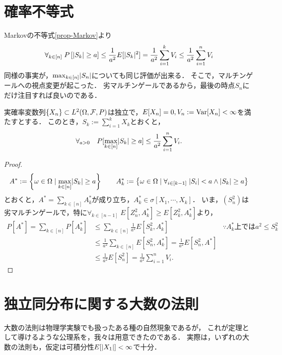 \documentclass[uplatex,dvipdfmx]{jsreport}
\begin{document}
\section{確率不等式}

\begin{tcolorbox}[colframe=ForestGreen, colback=ForestGreen!10!white,breakable,colbacktitle=ForestGreen!40!white,coltitle=black,fonttitle=\bfseries\sffamily,
title=]
    Markovの不等式\ref{prop-Markov}より
    \[\forall_{k\in[n]}\;P\left[\lvert S_k\rvert\ge a\right]\le\frac{1}{a^2}E[\lvert S_k\rvert^2]=\frac{1}{a^2}\sum_{i=1}^kV_i\le\frac{1}{a^2}\sum^n_{i=1}V_i\]
    同様の事実が，$\max_{k\in[n]}\lvert S_n\rvert$についても同じ評価が出来る．
    そこで，マルチンゲールへの視点変更が起こった．
    劣マルチンゲールであるから，最後の時点$S_n$にだけ注目すれば良いのである．
\end{tcolorbox}

\begin{theorem}[Kolmogorov]\label{thm-Kolmogorov-inequality}
    実確率変数列$\{X_n\}\subset L^2(\Omega,\mathcal{F},P)$は独立で，$E[X_n]=0,V_n:=\mathrm{Var}[X_n]<\infty$を満たすとする．
    このとき，$S_k:=\sum^k_{i=1}X_k$とおくと，
    \[\forall_{a>0}\quad P[\max_{k\in[n]}\lvert S_k\rvert\ge a]\le\frac{1}{a^2}\sum^n_{i=1}V_i.\]
\end{theorem}
\begin{proof}
    \[A^*:=\left\{\omega\in\Omega\mid\max_{k\in[n]}\lvert S_k\rvert\ge a\right\}\qquad A^*_k:=\left\{\omega\in\Omega\mid\forall_{i\in[k-1]}\;\lvert S_i\rvert<a\land\lvert S_k\rvert\ge a\right\}\]
    とおくと，$A^*=\sum_{k\in[n]}A^*_k$が成り立ち，$A^*_k\in\sigma[X_1,\cdots,X_k]$．
    いま，$(S^2_n)$は劣マルチンゲールで，特に$\forall_{k\in[n-1]}\;E[Z^2_n,A_k^*]\ge E[Z_k^2,A_k^*]$より，
    \begin{align*}
        P[A^*]=\sum_{k\in[n]}P[A^*_k]&\le\sum_{k\in[n]}\frac{1}{a^2}E[S_k^2,A_k^*]&\because A^*_k\text{上では}a^2\le S^2_k\\
        &\le\frac{1}{a^2}\sum_{k\in[n]}E[S_n^2,A^*_k]
        =\frac{1}{a^2}E[S_n^2,A^*]\\
        &\le\frac{1}{a^2}E[S_n^2]
        =\frac{1}{a^2}\sum^n_{i=1}V_i.
    \end{align*}
\end{proof}

\section{独立同分布に関する大数の法則}

\begin{tcolorbox}[colframe=ForestGreen, colback=ForestGreen!10!white,breakable,colbacktitle=ForestGreen!40!white,coltitle=black,fonttitle=\bfseries\sffamily,
title=]
    大数の法則は物理学実験でも扱ったある種の自然現象であるが，
    これが定理として導けるような公理系を，我々は用意できたのである．
    実際は，いずれの大数の法則も，仮定は可積分性$E[\lvert X_1\rvert]<\infty$で十分．
\end{tcolorbox}
\end{document}
